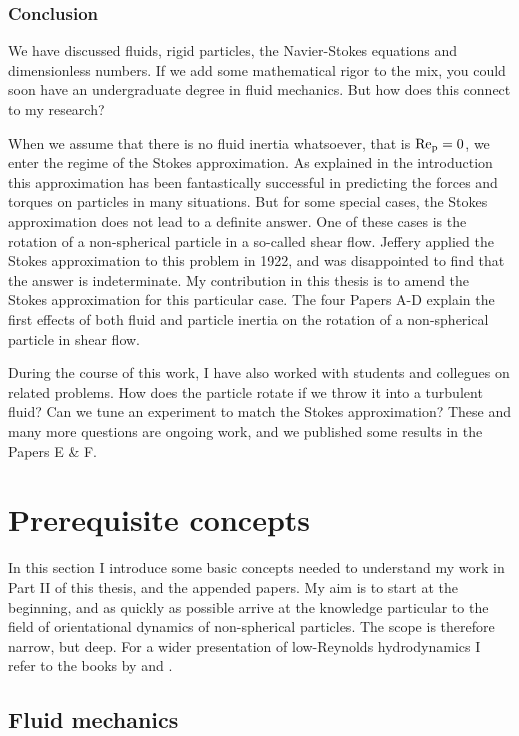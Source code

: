 \documentclass[thesis.tex]{subfiles}
\begin{document}
\subsection*{Conclusion}

We have discussed fluids, rigid particles, the Navier-Stokes equations and dimensionless numbers. If we add some mathematical rigor to the mix, you could soon have an undergraduate degree in fluid mechanics. But how does this connect to my research?

When we assume that there is no fluid inertia whatsoever, that is $\mbox{Re}_{\mathrm p}=0$, we enter the regime of the Stokes approximation. As explained in the introduction this approximation has been fantastically successful in predicting the forces and torques on particles in many situations. But for some special cases, the Stokes approximation does not lead to a definite answer. One of these cases is the rotation of a non-spherical particle in a so-called shear flow. Jeffery applied the Stokes approximation to this problem in 1922, and was disappointed to find that the answer is indeterminate. My contribution in this thesis is to amend the Stokes approximation for this particular case. The four Papers A-D explain the first effects of both fluid and particle inertia on the rotation of a non-spherical particle in shear flow.

During the course of this work, I have also worked with students and collegues on related problems. How does the particle rotate if we throw it into a turbulent fluid? Can we tune an experiment to match the Stokes approximation? These and many more questions are ongoing work, and we published some results in the Papers E \& F.

\chapter{Prerequisite concepts}\label{sec:prerequisites}

In this section I introduce some basic concepts needed to understand my work in Part II of this thesis, and the appended papers. My aim is to start at the beginning, and as quickly as possible arrive at the knowledge particular to the field of orientational dynamics of non-spherical particles. The scope is therefore narrow, but deep. For a wider presentation of low-Reynolds hydrodynamics I refer to the books by \citet{kim1991} and \citet{happel1965}.

\section{Fluid mechanics}
\end{document}
